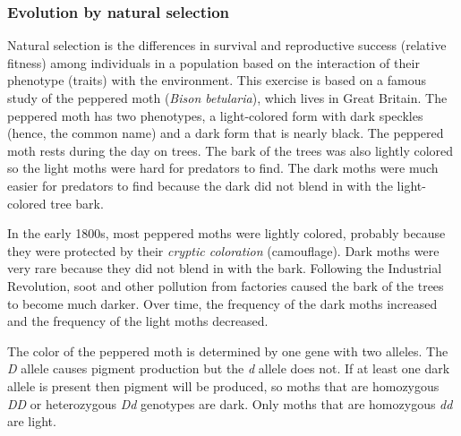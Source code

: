 \documentclass[12pt]{exam}
\newcommand{\allele}[1]{\textit{#1}}
\begin{document}
%  
%  
%
%
\subsubsection*{Evolution by natural selection}\label{sec:natural_selection}

Natural selection is the differences in survival and reproductive success (relative fitness) among individuals in a population based on the interaction of their phenotype (traits) with the environment. This exercise is based on a famous study of the peppered moth (\textit{Bison betularia}), which lives in Great Britain. The peppered moth has two phenotypes, a light-colored form with dark speckles (hence, the common name) and a dark form that is nearly black. The peppered moth rests during the day on trees. The bark of the trees was also lightly colored so the light moths were hard for predators to find. The dark moths were much easier for predators to find because the dark did not blend in with the light-colored tree bark. 

In the early 1800s, most peppered moths were lightly colored, probably because they were protected by their \emph{cryptic coloration} (camouflage). Dark moths were very rare because they did not blend in with the bark. Following the Industrial Revolution, soot and other pollution from factories caused the bark of the trees to become much darker. Over time, the frequency of the dark moths increased and the frequency of the light moths decreased. 

The color of the peppered moth is determined by one gene with two alleles. The \allele{D} allele causes pigment production but the \allele{d} allele does not. If at least one dark allele is present then pigment will be produced, so moths that are homozygous \allele{DD} or heterozygous \allele{Dd} genotypes are dark. Only moths that are homozygous \allele{dd} are light. 
\end{document}

